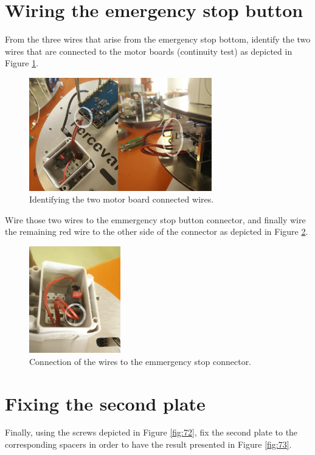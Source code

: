 \documentclass[10pt,a4paper]{report}   %
\begin{document}
\section{Wiring the emergency stop button}

From the three wires that arise from the emergency stop bottom, identify the two wires that are connected to the motor boards (continuity test) as depicted in Figure \ref{fig:70}.

\begin{figure}[H]
\center
\includegraphics[width=300px]{images/70.jpg}
\caption{Identifying the two motor board connected wires.}
\label{fig:70}
\end{figure}

Wire those two wires to the emmergency stop button connector, and finally wire the remaining red wire to the other side of the connector as depicted in Figure \ref{fig:71}.

\begin{figure}[H]
\center
\includegraphics[width=150px]{images/71.jpg}
\caption{Connection of the wires to the emmergency stop connector.}
\label{fig:71}
\end{figure}

\section{Fixing the second plate}

Finally, using the screws depicted in Figure \ref{fig:72}, fix the second plate to the corresponding spacers in order to have the result presented in Figure \ref{fig:73}.
\end{document}
